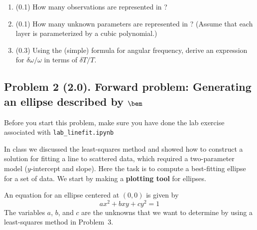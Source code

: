 \documentclass[11pt,titlepage,fleqn]{article}
\begin{document}
\begin{enumerate}
\begin{enumerate}
\item (0.1) How many observations are represented in ? 

\item (0.1) How many unknown parameters are represented in ? (Assume that each layer is parameterized by a cubic polynomial.)

\item (0.3) Using the (simple) formula for angular frequency, derive an expression for $\delta\omega/\omega$ in terms of $\delta T/T$.

\end{enumerate}

\end{enumerate}


\subsection*{Problem 2 (2.0). Forward problem: Generating an ellipse described by $\bem$}

Before you start this problem, make sure you have done the lab exercise associated with \verb+lab_linefit.ipynb+

In class we discussed the least-squares method and showed how to construct a solution for fitting a line to scattered data, which required a  two-parameter model ($y$-intercept and slope). Here the task is to compute a best-fitting ellipse for a set of data. We start by making a {\bf plotting tool} for ellipses.

An equation for an ellipse centered at $(0,0)$ is given by
%
\begin{equation}
ax^2 + bxy + cy^2 = 1
\label{ellipse}
\end{equation}
%
The variables $a$, $b$, and $c$ are the unknowns that we want to determine by using a least-squares method in Problem~3.
\end{document}
